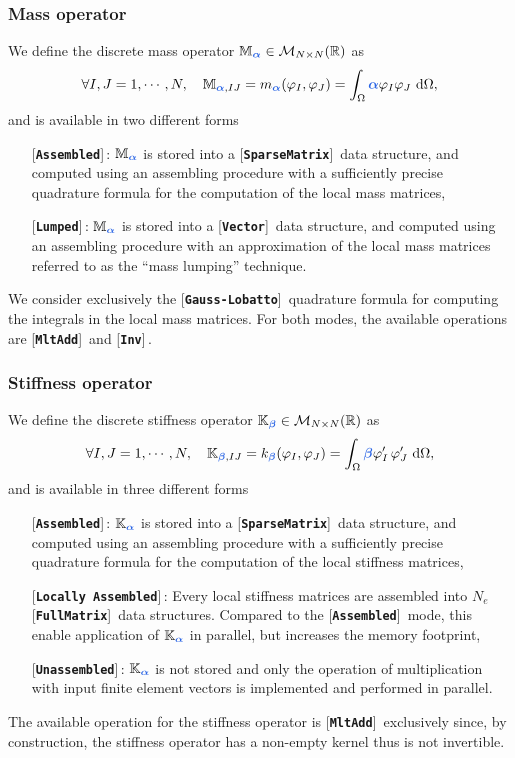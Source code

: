 \documentclass[11pt,a4paper]{article}
\newcommand{\param}[1]{\bm{{\color{myhyperblue}{#1}}}}
\newcommand{\keyword}[1]{[\texttt{\textbf{#1}}]\!\,}
\begin{document}
\subsubsection{Mass operator}
We define the discrete mass operator $\mathbb{M}_{\param{\alpha}} \in \mathcal{M}_{N\times N}(\mathbb{R})$ as
\begin{equation*}
\forall I,J = 1,\cdots, N,\quad \mathbb{M}_{\param{\alpha}, IJ} = m_{\param{\alpha}}(\varphi_I, \varphi_J) = \int_\Omega \param{\alpha} \varphi_I\varphi_J~\mathrm{d}\Omega,
\end{equation*}
and is available in two different forms
\begin{itemize}
\item[] \keyword{Assembled}: $\mathbb{M}_{\param{\alpha}}$ is stored into a \keyword{SparseMatrix} data structure, and computed using an assembling procedure with a sufficiently precise quadrature formula for the computation of the local mass matrices,
\item[] \keyword{Lumped}:  $\mathbb{M}_{\param{\alpha}}$ is stored into a \keyword{Vector} data structure, and computed using an assembling procedure with an approximation of the local mass matrices referred to as the ``mass lumping'' technique.
\end{itemize}
We consider exclusively the \keyword{Gauss-Lobatto} quadrature formula for computing the integrals in the local mass matrices. For both modes, the available operations are \keyword{MltAdd} and \keyword{Inv}.

\subsubsection{Stiffness operator}
We define the discrete stiffness operator $\mathbb{K}_{\param{\beta}} \in \mathcal{M}_{N\times N}(\mathbb{R})$ as
\begin{equation*}
\forall I,J = 1,\cdots, N,\quad \mathbb{K}_{\param{\beta}, IJ} = k_{\param{\beta}}(\varphi_I, \varphi_J) = \int_\Omega \param{\beta}\varphi_I^\prime\,\varphi_J^\prime~\mathrm{d}\Omega,
\end{equation*}
and is available in three different forms
\begin{itemize}
\item[] \keyword{Assembled}: $\mathbb{K}_{\param{\alpha}}$ is stored into a \keyword{SparseMatrix} data structure, and computed using an assembling procedure with a sufficiently precise quadrature formula for the computation of the local stiffness matrices,
\item[] \keyword{Locally Assembled}: Every local stiffness matrices are assembled into $N_e$ \keyword{FullMatrix} data structures. Compared to  the \keyword{Assembled} mode, this enable application of $\mathbb{K}_{\param{\alpha}}$ in parallel, but increases the memory footprint,
\item[] \keyword{Unassembled}: $\mathbb{K}_{\param{\alpha}}$ is not stored and only the operation of multiplication with input finite element vectors is implemented and performed in parallel.
\end{itemize}
The available operation for the stiffness operator is \keyword{MltAdd} exclusively since, by construction, the stiffness operator has a non-empty kernel thus is not invertible.
\end{document}
